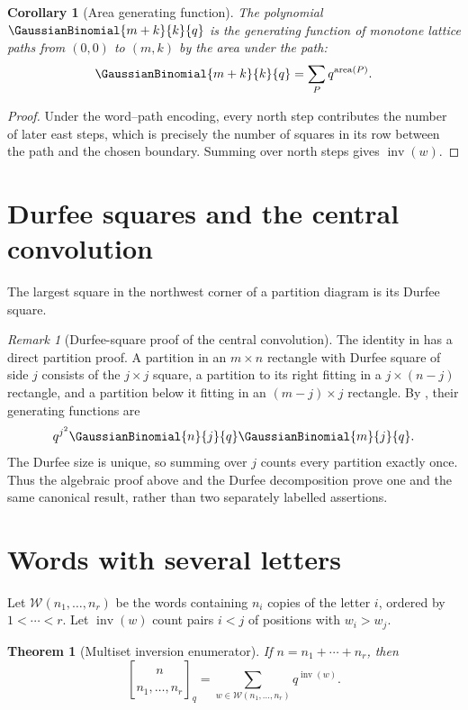 \documentclass[11pt,a4paper,oneside,openany]{book}
\newtheorem{theorem}{Theorem}[chapter]
\newtheorem{corollary}[corollary]{Corollary}
\theoremstyle{definition}
\theoremstyle{remark}
\newtheorem{remark}[remark]{Remark}
\newcommand{\inv}{\operatorname{inv}}
\newcommand{\area}{\operatorname{area}}
\begin{document}
\begin{corollary}[Area generating function]\label{cor:path-area}
The polynomial $\GaussianBinomial{m+k}{k}{q}$ is the generating function of monotone lattice paths from $(0,0)$ to $(m,k)$ by the area under the path:
\[
 \GaussianBinomial{m+k}{k}{q}=\sum_P q^{\area(P)}.
\]
\end{corollary}

\begin{proof}
Under the word--path encoding, every north step contributes the number of later east steps, which is precisely the number of squares in its row between the path and the chosen boundary.  Summing over north steps gives $\inv(w)$.
\end{proof}

\section{Durfee squares and the central convolution}

The largest square in the northwest corner of a partition diagram is its Durfee square.

\begin{remark}[Durfee-square proof of the central convolution]\label{rem:durfee-qvand}
The identity in  has a direct partition proof.
A partition in an $m\times n$ rectangle with Durfee square of side $j$
consists of the $j\times j$ square, a partition to its right fitting in a
$j\times(n-j)$ rectangle, and a partition below it fitting in an
$(m-j)\times j$ rectangle.  By , their
generating functions are
\[
 q^{j^2}\GaussianBinomial{n}{j}{q}\GaussianBinomial{m}{j}{q}.
\]
The Durfee size is unique, so summing over $j$ counts every partition exactly once.
Thus the algebraic proof above and the Durfee decomposition prove one and the
same canonical result, rather than two separately labelled assertions.
\end{remark}

\section{Words with several letters}

Let $\mathcal W(n_1,\dots,n_r)$ be the words containing $n_i$ copies of the letter $i$, ordered by $1<\cdots<r$.  Let $\inv(w)$ count pairs $i<j$ of positions with $w_i>w_j$.

\begin{theorem}[Multiset inversion enumerator]\label{thm:qmult-inversions}
If $n=n_1+\cdots+n_r$, then
\[
 \genfrac{[}{]}{0pt}{}{n}{n_1,\dots,n_r}_q
 =\sum_{w\in\mathcal W(n_1,\dots,n_r)}q^{\inv(w)}.
\]
\end{theorem}
\end{document}
